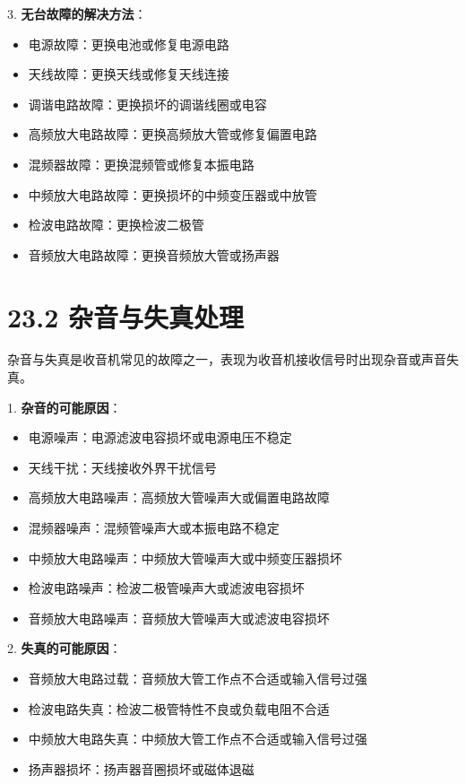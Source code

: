 \documentclass[12pt,UTF8]{ctexbook}
\begin{document}
3. \textbf{无台故障的解决方法}：
   \begin{itemize}[leftmargin=3.5em]
   \item 电源故障：更换电池或修复电源电路
   \item 天线故障：更换天线或修复天线连接
   \item 调谐电路故障：更换损坏的调谐线圈或电容
   \item 高频放大电路故障：更换高频放大管或修复偏置电路
   \item 混频器故障：更换混频管或修复本振电路
   \item 中频放大电路故障：更换损坏的中频变压器或中放管
   \item 检波电路故障：更换检波二极管
   \item 音频放大电路故障：更换音频放大管或扬声器
   \end{itemize}

\section*{23.2 杂音与失真处理}

杂音与失真是收音机常见的故障之一，表现为收音机接收信号时出现杂音或声音失真。

1. \textbf{杂音的可能原因}：
   \begin{itemize}[leftmargin=3.5em]
   \item 电源噪声：电源滤波电容损坏或电源电压不稳定
   \item 天线干扰：天线接收外界干扰信号
   \item 高频放大电路噪声：高频放大管噪声大或偏置电路故障
   \item 混频器噪声：混频管噪声大或本振电路不稳定
   \item 中频放大电路噪声：中频放大管噪声大或中频变压器损坏
   \item 检波电路噪声：检波二极管噪声大或滤波电容损坏
   \item 音频放大电路噪声：音频放大管噪声大或滤波电容损坏
   \end{itemize}

2. \textbf{失真的可能原因}：
   \begin{itemize}[leftmargin=3.5em]
   \item 音频放大电路过载：音频放大管工作点不合适或输入信号过强
   \item 检波电路失真：检波二极管特性不良或负载电阻不合适
   \item 中频放大电路失真：中频放大管工作点不合适或输入信号过强
   \item 扬声器损坏：扬声器音圈损坏或磁体退磁
   \end{itemize}
\end{document}
